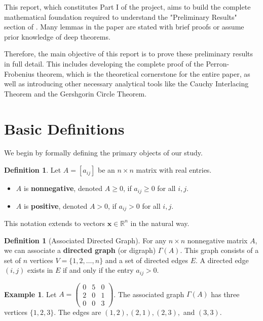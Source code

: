 \documentclass[12pt,a4paper]{report}
\theoremstyle{plain}
\theoremstyle{definition}
\newtheorem{definition}[theorem]{Definition}
\newtheorem{example}[theorem]{Example}
\theoremstyle{remark}
\begin{document}
This report, which constitutes Part I of the project, aims to build the complete mathematical foundation required to understand the "Preliminary Results" section of \cite{main_paper}. Many lemmas in the paper are stated with brief proofs or assume prior knowledge of deep theorems.

Therefore, the main objective of this report is to prove these preliminary results in full detail. This includes developing the complete proof of the Perron-Frobenius theorem, which is the theoretical cornerstone for the entire paper, as well as introducing other necessary analytical tools like the Cauchy Interlacing Theorem and the Gershgorin Circle Theorem.

\section{Basic Definitions}

We begin by formally defining the primary objects of our study.

\begin{definition}\label{def:nonnegative}
Let $A = [a_{ij}]$ be an $n \times n$ matrix with real entries.
\begin{itemize}
    \item $A$ is \textbf{nonnegative}, denoted $A \ge 0$, if $a_{ij} \ge 0$ for all $i, j$.
    \item $A$ is \textbf{positive}, denoted $A > 0$, if $a_{ij} > 0$ for all $i, j$.
\end{itemize}
This notation extends to vectors $\bm{x} \in \mathbb{R}^n$ in the natural way.
\end{definition}

\begin{definition}[Associated Directed Graph]\label{def:digraph}
For any $n \times n$ nonnegative matrix $A$, we can associate a \textbf{directed graph} (or digraph) $\Gamma(A)$. This graph consists of a set of $n$ vertices $V = \{1, 2, \dots, n\}$ and a set of directed edges $E$. A directed edge $(i, j)$ exists in $E$ if and only if the entry $a_{ij} > 0$.
\end{definition}

\begin{example}
Let $A = \begin{pmatrix} 0 & 5 & 0 \\ 2 & 0 & 1 \\ 0 & 0 & 3 \end{pmatrix}$. The associated graph $\Gamma(A)$ has three vertices $\{1, 2, 3\}$. The edges are $(1, 2), (2, 1), (2, 3),$ and $(3, 3)$.
\end{example}
\end{document}
